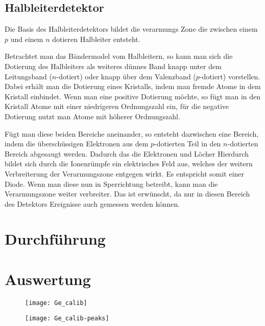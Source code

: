 \documentclass[11pt, ngerman, fleqn, DIV=15, headinclude, BCOR=2cm]{scrreprt}
\newcommand{\plotwidth}{0.8\linewidth}
\begin{document}
\section{Halbleiterdetektor}
Die Basis des Halbleiterdetektors bildet die verarmungs Zone die zwischen einem
$p$ und einem $n$ dotieren Halbleiter entsteht.

Betrachtet man das Bändermodel vom Halbleitern, so kann man sich die Dotierung
des Halbleiters als weiteres dünnes Band knapp unter dem Leitungsband
($n$-dotiert) oder knapp über dem Valenzband ($p$-dotiert) vorstellen.
Dabei erhält man die Dotierung eines Kristalls, indem man fremde Atome in dem
Kristall einbindet.
Wenn man eine positive Dotierung möchte, so fügt man in den Kristall Atome mit einer
niedrigeren Ordnungszahl ein, für die negative Dotierung nutzt man  Atome mit
höherer Ordnungszahl.

Fügt man diese beiden Bereiche aneinander, so entsteht dazwischen eine Bereich,
indem die überschüssigen Elektronen aus dem $p$-dotierten Teil in den
$n$-dotierten Bereich abgesaugt werden. 
Dadurch das die Elektronen und Löcher \fehlt
Hierdurch bildet sich durch die Ionenrümpfe ein elektrisches Feld aus, welches
der weitern Verbreiterung der Verarmungszone entgegen wirkt.
Es entspricht somit einer Diode.
Wenn man diese nun in Sperrichtung betreibt, kann man die Verarmungszone weiter
verbreiter.
Das ist erwünscht, da nur in diesen Bereich des Detektors Ereignisse auch
gemessen werden können.

\chapter{Durchführung}


\chapter{Auswertung}


\begin{figure}
    \centering
    \texttt{[image: Ge\_calib]}
    \caption{%
    }
    \label{fig:}
\end{figure}

\begin{figure}
    \centering
    \texttt{[image: Ge\_calib-peaks]}
    \caption{%
    }
    \label{fig:}
\end{figure}
\end{document}

